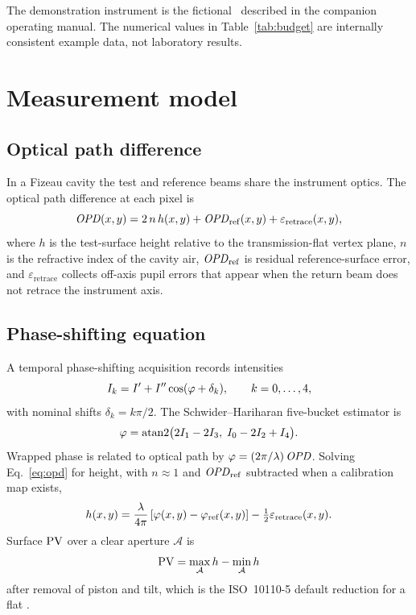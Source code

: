 The demonstration instrument is the fictional \instrumentlong\ described in the companion operating manual. The numerical values in Table~\ref{tab:budget} are internally consistent example data, not laboratory results.

\section{Measurement model}

\subsection{Optical path difference}

In a Fizeau cavity the test and reference beams share the instrument optics. The optical path difference at each pixel is \cite{bornwolf1999,malacara2007}
\begin{equation}
  \mathit{OPD}(x,y) = 2\,n\,h(x,y) + \mathit{OPD}_{\mathrm{ref}}(x,y) + \varepsilon_{\mathrm{retrace}}(x,y),
  \label{eq:opd}
\end{equation}
where \(h\) is the test-surface height relative to the transmission-flat vertex plane, \(n\) is the refractive index of the cavity air, \(\mathit{OPD}_{\mathrm{ref}}\) is residual reference-surface error, and \(\varepsilon_{\mathrm{retrace}}\) collects off-axis pupil errors that appear when the return beam does not retrace the instrument axis.

\subsection{Phase-shifting equation}

A temporal phase-shifting acquisition records intensities
\begin{equation}
  I_k = I' + I''\cos(\varphi + \delta_k), \qquad k = 0,\ldots,4,
  \label{eq:Ik}
\end{equation}
with nominal shifts \(\delta_k = k\pi/2\). The Schwider--Hariharan five-bucket estimator \cite{schwider1983,hariharan1987,creath1988} is
\begin{equation}
  \varphi = \operatorname{atan2}\bigl(2I_1 - 2I_3,\; I_0 - 2I_2 + I_4\bigr).
  \label{eq:phase}
\end{equation}
Wrapped phase is related to optical path by \(\varphi = (2\pi/\lambda)\,\mathit{OPD}\). Solving Eq.~\eqref{eq:opd} for height, with \(n\approx 1\) and \(\mathit{OPD}_{\mathrm{ref}}\) subtracted when a calibration map exists,
\begin{equation}
  h(x,y) = \frac{\lambda}{4\pi}\,[\varphi(x,y)-\varphi_{\mathrm{ref}}(x,y)] - \tfrac12\varepsilon_{\mathrm{retrace}}(x,y).
  \label{eq:height}
\end{equation}
Surface \(\mathrm{PV}\) over a clear aperture \(\mathcal{A}\) is
\begin{equation}
  \mathrm{PV} = \max_{\mathcal{A}} h - \min_{\mathcal{A}} h
  \label{eq:pv}
\end{equation}
after removal of piston and tilt, which is the ISO~10110-5 default reduction for a flat \cite{iso10110-5,bruning1974,wyant2013}.

